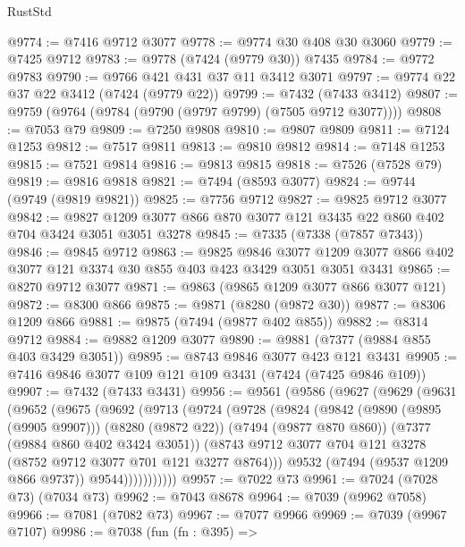 \begin{lexlean}{RustStd}
\begin{coremodule}
{\begin{coremodule}
{{{{{{{{{{{{{{{{{{{{{{{{{{{{{{{{@9774 := @7416 @9712 @3077
@9778 := @9774 @30 @408 @30 @3060
@9779 := @7425 @9712
@9783 := @9778 (@7424 (@9779 @30)) @7435
@9784 := @9772 @9783
@9790 := @9766 @421 @431 @37 @11 @3412 @3071
@9797 := @9774 @22 @37 @22 @3412 (@7424 (@9779 @22))
@9799 := @7432 (@7433 @3412)
@9807 := @9759 (@9764 (@9784 (@9790 (@9797 @9799) (@7505 @9712 @3077))))
@9808 := @7053 @79
@9809 := @7250 @9808
@9810 := @9807 @9809
@9811 := @7124 @1253
@9812 := @7517 @9811
@9813 := @9810 @9812
@9814 := @7148 @1253
@9815 := @7521 @9814
@9816 := @9813 @9815
@9818 := @7526 (@7528 @79)
@9819 := @9816 @9818
@9821 := @7494 (@8593 @3077)
@9824 := @9744 (@9749 (@9819 @9821))
@9825 := @7756 @9712
@9827 := @9825 @9712 @3077
@9842 := @9827 @1209 @3077 @866 @870 @3077 @121 @3435 @22 @860 @402 @704 @3424 @3051 @3051 @3278
@9845 := @7335 (@7338 (@7857 @7343))
@9846 := @9845 @9712
@9863 := @9825
    @9846
    @3077
    @1209
    @3077
    @866
    @402
    @3077
    @121
    @3374
    @30
    @855
    @403
    @423
    @3429
    @3051
    @3051
    @3431
@9865 := @8270 @9712 @3077
@9871 := @9863 (@9865 @1209 @3077 @866 @3077 @121)
@9872 := @8300 @866
@9875 := @9871 (@8280 (@9872 @30))
@9877 := @8306 @1209 @866
@9881 := @9875 (@7494 (@9877 @402 @855))
@9882 := @8314 @9712
@9884 := @9882 @1209 @3077
@9890 := @9881 (@7377 (@9884 @855 @403 @3429 @3051))
@9895 := @8743 @9846 @3077 @423 @121 @3431
@9905 := @7416 @9846 @3077 @109 @121 @109 @3431 (@7424 (@7425 @9846 @109))
@9907 := @7432 (@7433 @3431)
@9956 := @9561
    (@9586
      (@9627
        (@9629
          (@9631
            (@9652
              (@9675
                (@9692
                  (@9713
                    (@9724
                      (@9728
                        (@9824
                          (@9842
                            (@9890 (@9895 (@9905 @9907)))
                            (@8280 (@9872 @22))
                            (@7494 (@9877 @870 @860))
                            (@7377 (@9884 @860 @402 @3424 @3051))
                            (@8743
                              @9712
                              @3077
                              @704
                              @121
                              @3278
                              (@8752 @9712 @3077 @701 @121 @3277 @8764)))
                          @9532
                          (@7494 (@9537 @1209 @866 @9737))
                          @9544)))))))))))
@9957 := @7022 @73
@9961 := @7024 (@7028 @73) (@7034 @73)
@9962 := @7043 @8678
@9964 := @7039 (@9962 @7058)
@9966 := @7081 (@7082 @73)
@9967 := @7077 @9966
@9969 := @7039 (@9967 @7107)
@9986 := @7038
    (fun (fn : @395) =>
}}}}}}}}}}}}}}}}}}}}}}}}}}}}}}}}
\end{coremodule}}
\end{coremodule}
\end{lexlean}
